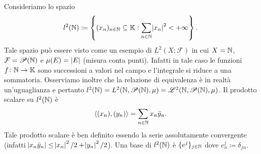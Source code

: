 \begin{example}[spazio $ l^2 $]
    Consideriamo lo spazio 
    \[
        l^2(\mathbb{N}) \coloneqq \left\{(x_n)_{n \in \mathbb{N}} \subseteq \mathbb{K} : \sum_{n \in \mathbb{N}} \abs{x_n}^2 < +\infty\right\}.
    \]
    Tale spazio può essere visto come un esempio di $ L^2(X; \mathcal{F}) $ in cui $ X = \mathbb{N} $, $ \mathcal{F} = \mathscr{P}(\mathbb{N}) $ e $ \mu(E) = \left|E\right| $ (misura conta punti). Infatti in tale caso le funzioni $ f \colon \mathbb{N} \to \mathbb{K} $ sono successioni a valori nel campo e l'integrale si riduce a una sommatoria. Osserviamo inoltre che la relazione di equivalenza è in realtà un'uguaglianza e pertanto $ l^2(\mathbb{N}) = L^2(\mathbb{N}, \mathscr{P}(\mathbb{N}), \mu) = \mathscr{L}^2(\mathbb{N}, \mathscr{P}(\mathbb{N}), \mu) $. Il prodotto scalare su $ l^2(\mathbb{N}) $ è
    \[
        {\langle (x_n), (y_n) \rangle} = \sum_{n \in \mathbb{N}} x_n \bar{y}_n.
    \]
    Tale prodotto scalare è ben definito essendo la serie assolutamente convergente (infatti $ \abs{x_n \bar{y}_n} \leq \abs{x_n}^2 /2 + \abs{y_n}^2 /2 $). Una base di $ l^2(\mathbb{N}) $ è $ \{e^j\}_{j \in \mathbb{N}} $ dove $ e^j_n \coloneqq \delta_{jn} $.
\end{example}

